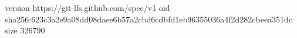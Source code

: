 version https://git-lfs.github.com/spec/v1
oid sha256:623c3a2e9a08dd08daee6b57a2cbd6cdbfd1eb96355036a4f2d282cbeea351dc
size 326790
